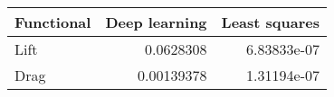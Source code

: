 \begin{tabular}{lrr}
\toprule
 Functional   &   Deep learning &   Least squares \\
\midrule
 Lift         &      0.0628308  &     6.83833e-07 \\
 Drag         &      0.00139378 &     1.31194e-07 \\
\bottomrule
\end{tabular}
